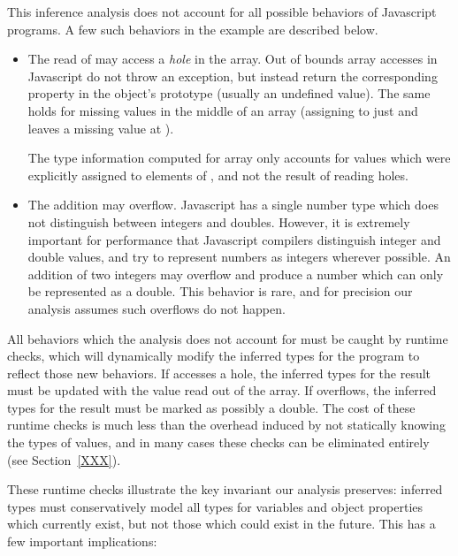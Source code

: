 This inference analysis does not account for all possible behaviors
of Javascript programs.
A few such behaviors in the example are described below.

\begin{itemize}

\item The read of  may access a {\it hole} in the array.
Out of bounds array accesses in Javascript do not throw an exception,
but instead return the corresponding property in the object's prototype
(usually an undefined value).
The same holds for missing values in the middle of an array
(assigning to just  and  leaves a missing
value at ).

The type information computed for array  only accounts for
values which were explicitly assigned to elements of , and not the
result of reading holes.

\item The addition  may overflow.
Javascript has a single number type which does not distinguish between
integers and doubles.
However, it is extremely important for performance that Javascript compilers
distinguish integer and double values, and try to represent numbers as
integers wherever possible.
An addition of two integers may overflow and produce a number which can
only be represented as a double.
This behavior is rare, and for precision our analysis assumes
such overflows do not happen.

\end{itemize}

All behaviors which the analysis does not account for must be caught
by runtime checks, which will dynamically modify the inferred types
for the program to reflect those new behaviors.
If  accesses a hole, the inferred types for the result must be
updated with the value read out of the array.
If  overflows, the inferred types for the result must be
marked as possibly a double.
The cost of these runtime checks is much less than the overhead induced
by not statically knowing the types of values, and in many cases these
checks can be eliminated entirely (see Section~\ref{XXX}).

These runtime checks illustrate the key invariant our analysis
preserves: inferred types must conservatively model all types for
variables and object properties which currently exist, but not those
which could exist in the future.
This has a few important implications:

